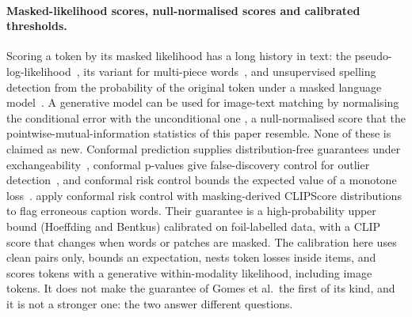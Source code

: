 \paragraph{Masked-likelihood scores, null-normalised scores and calibrated thresholds.}
Scoring a token by its masked likelihood has a long history in text: the pseudo-log-likelihood~\citep{salazar2020mlm}, its
variant for multi-piece words~\citep{kauf2023plwl2r}, and unsupervised spelling detection from the probability of the original
token under a masked language model~\citep{li2022uchecker}.
A generative model can be used for image-text matching by normalising the conditional error with the unconditional one
\citep{krojer2023diffusionitm}, a null-normalised score that the pointwise-mutual-information statistics of this paper
resemble.
None of these is claimed as new.
Conformal prediction supplies distribution-free guarantees under exchangeability~\citep{vovk2005algorithmic,angelopoulos2023gentle},
conformal p-values give false-discovery control for outlier detection~\citep{bates2023outliers}, and conformal risk control
bounds the expected value of a monotone loss~\citep{angelopoulos2024crc}.
\citet{gomes2025crc} apply conformal risk control with masking-derived CLIPScore distributions to flag erroneous
caption words.
Their guarantee is a high-probability upper bound (Hoeffding and Bentkus) calibrated on foil-labelled data, with a CLIP
score that changes when words or patches are masked.
The calibration here uses clean pairs only, bounds an expectation, nests token losses inside items, and scores tokens
with a generative within-modality likelihood, including image tokens.
It does not make the guarantee of Gomes et al.\ the first of its kind, and it is not a stronger one: the two answer
different questions.

